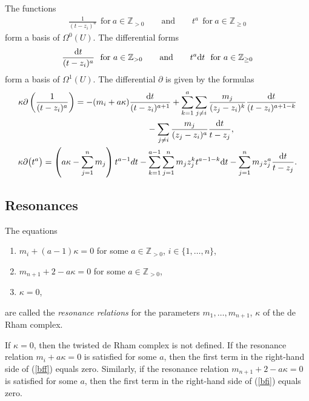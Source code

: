 \documentclass[pdftex]{sigma}
\numberwithin{equation}{section}
\begin{document}
The functions
\begin{gather*}
\frac1{(t-z_i)^{a}}\ \ \text{for}\ a\in{\mathbb Z}_{>0} \qquad\text{and}\qquad t^a\ \ \text{for}\ a\in{\mathbb Z}_{\geq 0}
\end{gather*}
form a basis of $\Omega^0(U)$. The differential forms
\begin{gather*}
\frac{{\rm d}t}{(t-z_i)^a}\ \ \text{for}\ a\in{\mathbb Z}_{>0} \qquad \text{and}\qquad t^a{\rm d}t\ \ \text{for}\ a\in{\mathbb Z}_{\geq 0}
\end{gather*}
form a basis of $\Omega^1(U)$. The differential $\partial$ is given by the formulas
\begin{gather}
\kappa \partial\left(\frac1{(t-z_i)^{a}}\right) = -(m_i+a\kappa)\frac{{\rm d} t}{(t-z_i)^{a+1}}
+ \sum_{k=1}^a\sum_{j\neq i} \frac{m_j}{(z_j-z_i)^k} \frac{{\rm d}t}{(t-z_i)^{a+1-k}} \nonumber\\
\hphantom{\kappa \partial\left(\frac1{(t-z_i)^{a}}\right) =}{} -\sum_{j\neq i}\frac{ m_j}{(z_j-z_i)^a} \frac{{\rm d}t}{t-z_j}, \label{bff} \\
\kappa \partial\big(t^a\big) = \left(a\kappa -\sum_{j=1}^n m_j\right)t^{a-1}dt -\sum_{k=1}^{a-1} \sum_{j=1}^n m_jz_j^k t^{a-1-k}{\rm d}t-\sum_{j=1}^n m_jz_j^a \frac{{\rm d}t}{t-z_j}.\label{bfi}
\end{gather}


\subsection{Resonances}\label{reson}
The equations
\begin{enumerate}\itemsep=0pt
\item[(i)] $m_i+(a-1)\kappa=0$ for some $a\in {\mathbb Z}_{>0}$, $i\in\{1,\dots,n\}$,
\item[(ii)] $m_{n+1}+2-a\kappa=0$ for some $a\in {\mathbb Z}_{>0}$,
\item[(iii)] $\kappa=0$,
\end{enumerate}
are called the {\it resonance relations} for the parameters $m_1,\dots,m_{n+1}$, $\kappa$ of the de Rham complex.

If $\kappa=0$, then the twisted de Rham complex is not defined. If the resonance relation \mbox{$m_i+a\kappa=0$} is satisfied for some $a$, then the first term in the right-hand side of (\ref{bff}) equals zero. Similarly, if the resonance relation $m_{n+1}+2-a\kappa=0$ is satisfied for some $a$, then the first term in the right-hand side of (\ref{bfi}) equals zero.
\end{document}
